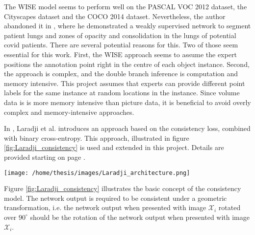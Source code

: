 \par{
    The WISE model seems to perform well on the PASCAL VOC 2012 dataset, the Cityscapes dataset and the COCO 2014 dataset. 
    Nevertheless, the author abandoned it in \cite{Laradji2021,Laradji2020b}, where he demonstrated a weakly supervised network to segment patient lungs and zones of opacity and consolidation in the lungs of potential \Gls{covid} patients.
    There are several potential reasons for this. 
    Two of those seem essential for this work. 
    First, the WISE approach seems to assume the expert positions the annotation point right in the centre of each object instance.
    Second, the approach is complex, and the double branch inference is computation and memory intensive. 
    This project assumes that experts can provide different point labels for the same instance at random locations in the instance.
    Since volume data is is more memory intensive than picture data, it is beneficial to avoid overly complex and memory-intensive approaches.
}
\par{
    In \cite{Laradji2021}, Laradji et al. introduces an approach based on the consistency loss, combined with binary cross-entropy.
    This approach, illustrated in figure \ref{fig:Laradji_consistency} is used and extended in this project.
    Details are provided starting on page \pageref{sec:model_concept}.
}
\begin{SCfigure}[][htb]
    \texttt{[image: /home/thesis/images/Laradji\_architecture.png]}
    \caption{Illustration from \cite{Laradji2021}. The consistency loss approach is based on the combination of two loss terms: the \Gls{unsupervisedl} consistency loss and the (weakly) \Gls{supervisedl} point (cross entropy) loss.}
    \label{fig:Laradji_consistency}
\end{SCfigure}
\par{
    Figure \ref{fig:Laradji_consistency} illustrates the basic concept of the consistency model.
    The network output is required to be consistent under a geometric transformation, i.e. the network output when presented with image $\mathcal{X}_i$ rotated over $90^\circ$ should be the rotation of the network output when presented with image $\mathcal{X}_i$.
}